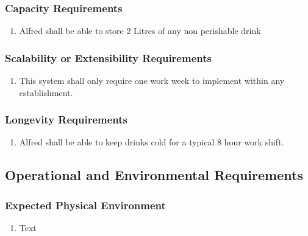\documentclass [11pt]{article}
\begin{document}
\subsubsection{Capacity Requirements }
	\begin{enumerate}[label=\textbf{(\roman*)}]
		\item Alfred shall be able to store 2 Litres of any non perishable drink
	\end{enumerate}

\subsubsection{Scalability or Extensibility Requirements }
	\begin{enumerate}[label=\textbf{(\roman*)}]
		\item This system shall only require one work week to implement within any establishment.
	\end{enumerate}

\subsubsection{Longevity Requirements }
	\begin{enumerate}[label=\textbf{(\roman*)}]
		\item Alfred shall be able to keep drinks cold for a typical 8 hour work shift.
	\end{enumerate}

\subsection{Operational and Environmental Requirements}

\subsubsection{Expected Physical Environment }
	\begin{enumerate}[label=\textbf{(\roman*)}]
		\item Text
	\end{enumerate}
\end{document}
